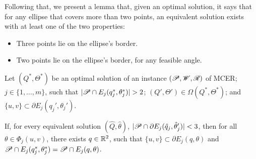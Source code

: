Following that, we present a lemma that, given an optimal solution, it says that for any ellipse that covers more than two points, an equivalent solution exists with at least one of the two properties:
\begin{itemize}
	\item Three points lie on the ellipse's border.
	\item Two points lie on the ellipse's border, for any feasible angle.
\end{itemize}

\begin{lema}\label{lema:3pnts}
Let $(Q^*, \Theta^*)$ be an optimal solution of an instance $(\mathscr{P}, \mathscr{W}, \mathscr{R})$ of MCER; $j\in\{1, \dots, m\}$, such that $|\Pp \cap E_j(q_j^*, \theta_j^*)|>2$; $(Q', \Theta')\in\Omega(Q^*, \Theta^*)$; and $\{u, v\}\subset \partial E_j(q_j', \theta_j')$.

If, for every equivalent solution $(\hat{Q}, \hat{\theta})$, $|\mathscr{P}\cap \partial E_j(\hat{q}_j, \hat{\theta}'_j)| < 3$, then for all $\theta\in\Phi_j(u,v)$, there exists $q\in\mathbb{R}^2$, such that $\{u, v\} \subset \partial E_j(q, \theta)$ and $\mathscr{P} \cap E_j(q^*_j, \theta^*_j) = \mathscr{P} \cap E_j(q, \theta)$.

\end{lema}

